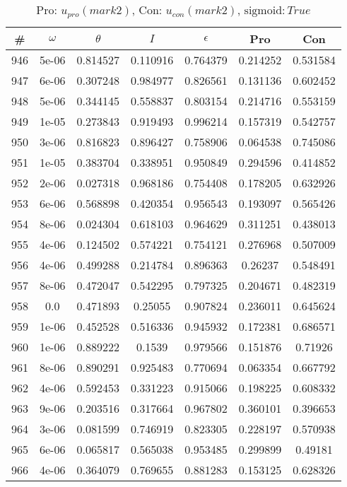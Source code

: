 \newpage
\begin{table}
\caption{Pro: $u_{pro} (mark 2)$, Con: $u_{con} (mark 2)$, $\mathrm{sigmoid}: True$}
\begin{tabular*}{\linewidth}{c|c|c|c|c|c|c}
\# & $\omega$ & $\theta$ & $I$ & $\epsilon$ & Pro & Con \\
\hline
946 & 5e-06 & 0.814527 & 0.110916 & 0.764379 & 0.214252 & 0.531584\\
947 & 6e-06 & 0.307248 & 0.984977 & 0.826561 & 0.131136 & 0.602452\\
948 & 5e-06 & 0.344145 & 0.558837 & 0.803154 & 0.214716 & 0.553159\\
949 & 1e-05 & 0.273843 & 0.919493 & 0.996214 & 0.157319 & 0.542757\\
950 & 3e-06 & 0.816823 & 0.896427 & 0.758906 & 0.064538 & 0.745086\\
951 & 1e-05 & 0.383704 & 0.338951 & 0.950849 & 0.294596 & 0.414852\\
952 & 2e-06 & 0.027318 & 0.968186 & 0.754408 & 0.178205 & 0.632926\\
953 & 6e-06 & 0.568898 & 0.420354 & 0.956543 & 0.193097 & 0.565426\\
954 & 8e-06 & 0.024304 & 0.618103 & 0.964629 & 0.311251 & 0.438013\\
955 & 4e-06 & 0.124502 & 0.574221 & 0.754121 & 0.276968 & 0.507009\\
956 & 4e-06 & 0.499288 & 0.214784 & 0.896363 & 0.26237 & 0.548491\\
957 & 8e-06 & 0.472047 & 0.542295 & 0.797325 & 0.204671 & 0.482319\\
958 & 0.0 & 0.471893 & 0.25055 & 0.907824 & 0.236011 & 0.645624\\
959 & 1e-06 & 0.452528 & 0.516336 & 0.945932 & 0.172381 & 0.686571\\
960 & 1e-06 & 0.889222 & 0.1539 & 0.979566 & 0.151876 & 0.71926\\
961 & 8e-06 & 0.890291 & 0.925483 & 0.770694 & 0.063354 & 0.667792\\
962 & 4e-06 & 0.592453 & 0.331223 & 0.915066 & 0.198225 & 0.608332\\
963 & 9e-06 & 0.203516 & 0.317664 & 0.967802 & 0.360101 & 0.396653\\
964 & 3e-06 & 0.081599 & 0.746919 & 0.823305 & 0.228197 & 0.570938\\
965 & 6e-06 & 0.065817 & 0.565038 & 0.953485 & 0.299899 & 0.49181\\
966 & 4e-06 & 0.364079 & 0.769655 & 0.881283 & 0.153125 & 0.628326\\

\end{tabular*}
\end{table}
